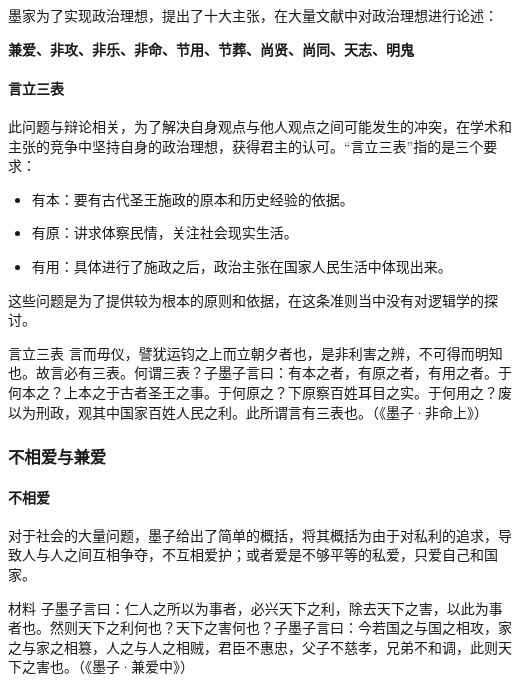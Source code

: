 墨家为了实现政治理想，提出了十大主张，在大量文献中对政治理想进行论述：

\textbf{兼爱、非攻、非乐、非命、节用、节葬、尚贤、尚同、天志、明鬼}

\paragraph{言立三表}

此问题与辩论相关，为了解决自身观点与他人观点之间可能发生的冲突，在学术和主张的竞争中坚持自身的政治理想，获得君主的认可。“言立三表”指的是三个要求：

\begin{itemize}
    \item 有本：要有古代圣王施政的原本和历史经验的依据。
    \item 有原：讲求体察民情，关注社会现实生活。
    \item 有用：具体进行了施政之后，政治主张在国家人民生活中体现出来。
\end{itemize}

这些问题是为了提供较为根本的原则和依据，在这条准则当中没有对逻辑学的探讨。

\begin{fancybox}{言立三表}
    言而毋仪，譬犹运钧之上而立朝夕者也，是非利害之辨，不可得而明知也。故言必有三表。何谓三表？子墨子言曰：有本之者，有原之者，有用之者。于何本之？上本之于古者圣王之事。于何原之？下原察百姓耳目之实。于何用之？废以为刑政，观其中国家百姓人民之利。此所谓言有三表也。（《墨子·非命上》） 
\end{fancybox}

\subsubsection{不相爱与兼爱}

\paragraph{不相爱}

对于社会的大量问题，墨子给出了简单的概括，将其概括为由于对私利的追求，导致人与人之间互相争夺，不互相爱护；或者爱是不够平等的私爱，只爱自己和国家。

\begin{fancybox}{材料}
    子墨子言曰：仁人之所以为事者，必兴天下之利，除去天下之害，以此为事者也。然则天下之利何也？天下之害何也？子墨子言曰：今若国之与国之相攻，家之与家之相篡，人之与人之相贼，君臣不惠忠，父子不慈孝，兄弟不和调，此则天下之害也。（《墨子·兼爱中》）
\end{fancybox}

